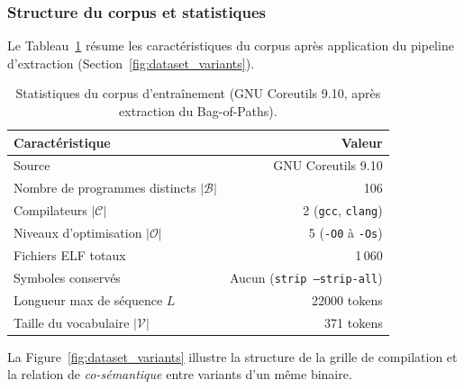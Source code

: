 \subsubsection{Structure du corpus et statistiques}

Le Tableau~\ref{tab:dataset_stats} résume les caractéristiques du
corpus après application du pipeline d'extraction
(Section~\ref{fig:dataset_variants}).

\begin{table}[ht]
\centering
\caption{Statistiques du corpus d'entraînement (GNU Coreutils 9.10,
  après extraction du Bag-of-Paths).}
\label{tab:dataset_stats}
\renewcommand{\arraystretch}{1.3}
\begin{tabular}{lr}
\toprule
\textbf{Caractéristique}                          & \textbf{Valeur}  \\
\midrule
Source                                            & GNU Coreutils 9.10 \\
Nombre de programmes distincts $|\mathcal{B}|$    & 106 \\
Compilateurs $|\mathcal{C}|$                      & 2 (\texttt{gcc}, \texttt{clang}) \\
Niveaux d'optimisation $|\mathcal{O}|$            & 5 (\texttt{-O0} à \texttt{-Os}) \\
Fichiers ELF totaux                               & 1\,060 \\
Symboles conservés                                & Aucun (\texttt{strip --strip-all}) \\
Longueur max de séquence $L$                      & 22000 tokens \\
Taille du vocabulaire $|\mathcal{V}|$             & 371 tokens \\
\bottomrule
\end{tabular}
\end{table}

La Figure~\ref{fig:dataset_variants} illustre la structure de la
grille de compilation et la relation de \emph{co-sémantique} entre
variants d'un même binaire.

